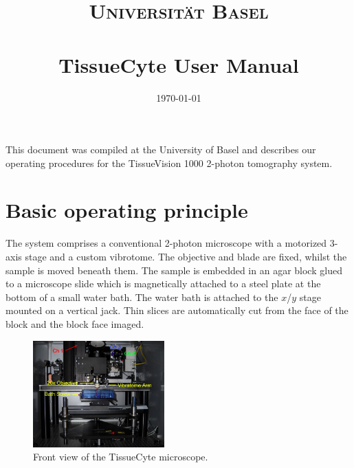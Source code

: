 \documentclass[paper=a4, fontsize=11pt]{scrartcl} %
\title{	
\normalfont \normalsize 
\textsc{Universit\"{a}t Basel} \\ [25pt] %
\horrule{0.5pt} \\[0.2cm] %
\huge TissueCyte User Manual %
\horrule{1.5pt}\\ %
}
\date{\normalsize\today} %
\numberwithin{equation}{section} %
\numberwithin{figure}{section} %
\numberwithin{table}{section} %
\begin{document}
\maketitle %

This document was compiled at the University of Basel and describes our operating procedures for the TissueVision 1000 2-photon tomography system.


\section{Basic operating principle}
The system comprises a conventional 2-photon microscope with a motorized 3-axis stage and a custom vibrotome. 
The objective and blade are fixed, whilst the sample is moved beneath them. 
The sample is embedded in an agar block glued to a microscope slide which is magnetically attached to a steel plate at the bottom of a small water bath.
The water bath is attached to the $x$/$y$ stage mounted on a vertical jack. 
Thin slices are automatically cut from the face of the block and the block face imaged. 

\begin{figure}[h]
\centering
\includegraphics[width=0.45\textwidth,natwidth=708,natheight=575]{scopeImage.png}
\caption{Front view of the TissueCyte microscope.}
\label{fig:scope_front}
\end{figure}


\clearpage
\end{document}
